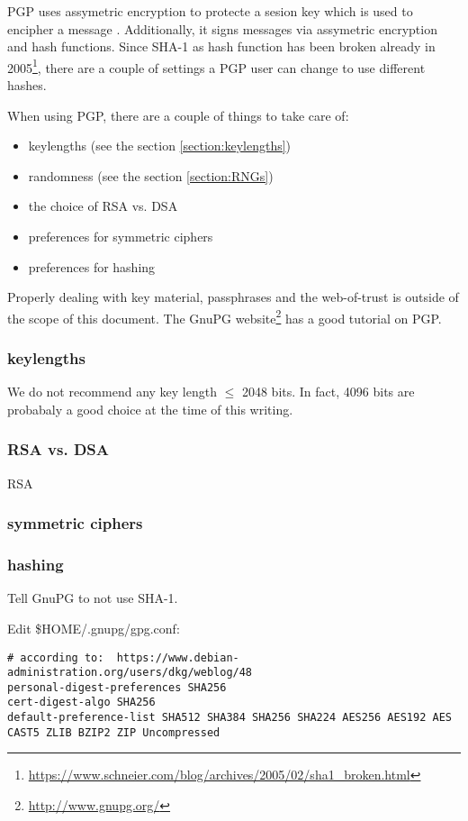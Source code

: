 
PGP uses assymetric encryption to protecte a sesion key which is used to encipher a message . Additionally, it signs messages via assymetric encryption and hash functions.
Since SHA-1 as hash function has been broken already in 2005\footnote{\url{https://www.schneier.com/blog/archives/2005/02/sha1\_broken.html}}, there are a couple of settings a PGP user can change to use different hashes.

When using PGP, there are a couple of things to take care of:
\begin{itemize}
\item keylengths (see the section \ref{section:keylengths})
\item randomness (see the section \ref{section:RNGs})
\item the choice of RSA vs. DSA 
\item preferences for symmetric ciphers
\item preferences for hashing
\end{itemize}

Properly dealing with key material, passphrases and the web-of-trust  is outside of the scope of this document. The GnuPG website\footnote{\url{http://www.gnupg.org/}} has a good tutorial on PGP.

\subsubsection{keylengths}
We do not recommend any key length $\le$ 2048 bits. In fact, 4096 bits are probabaly a good choice at the time of this writing.

\subsubsection{RSA vs. DSA}
RSA%

\subsubsection{symmetric ciphers}


\subsubsection{hashing}
Tell GnuPG to not use SHA-1.

Edit \$HOME/.gnupg/gpg.conf:

\begin{lstlisting}[breaklines]
# according to:  https://www.debian-administration.org/users/dkg/weblog/48
personal-digest-preferences SHA256
cert-digest-algo SHA256
default-preference-list SHA512 SHA384 SHA256 SHA224 AES256 AES192 AES CAST5 ZLIB BZIP2 ZIP Uncompressed
\end{lstlisting}

